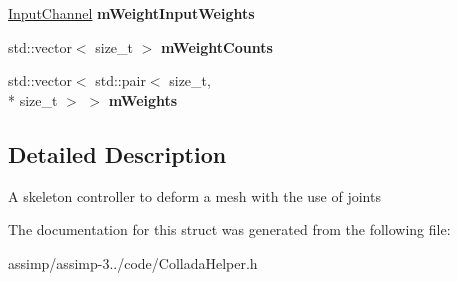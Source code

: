 \begin{DoxyCompactItemize}
\item 
\hypertarget{struct_assimp_1_1_collada_1_1_controller_ad6cb7ba43d3f63891fc2942b75d496ea}{\hyperlink{struct_assimp_1_1_collada_1_1_input_channel}{Input\+Channel} {\bfseries m\+Weight\+Input\+Weights}}\label{struct_assimp_1_1_collada_1_1_controller_ad6cb7ba43d3f63891fc2942b75d496ea}

\item 
\hypertarget{struct_assimp_1_1_collada_1_1_controller_ae8dddf8a906fa49ecaee06d94f0fb412}{std\+::vector$<$ size\+\_\+t $>$ {\bfseries m\+Weight\+Counts}}\label{struct_assimp_1_1_collada_1_1_controller_ae8dddf8a906fa49ecaee06d94f0fb412}

\item 
\hypertarget{struct_assimp_1_1_collada_1_1_controller_a5d35df47f4c6bda93c3dc871bdcd91a1}{std\+::vector$<$ std\+::pair$<$ size\+\_\+t, \\*
size\+\_\+t $>$ $>$ {\bfseries m\+Weights}}\label{struct_assimp_1_1_collada_1_1_controller_a5d35df47f4c6bda93c3dc871bdcd91a1}

\end{DoxyCompactItemize}


\subsection{Detailed Description}
A skeleton controller to deform a mesh with the use of joints 

The documentation for this struct was generated from the following file\+:\begin{DoxyCompactItemize}
\item 
assimp/assimp-\/3../code/Collada\+Helper.\+h\end{DoxyCompactItemize}
